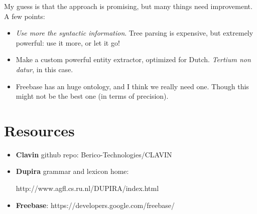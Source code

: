 \documentclass[11pt,leqno,fleqn]{article}
\begin{document}
My guess is that the approach is promising, but many things need improvement. A few points:
\begin{itemize}
\item \emph{Use more the syntactic information}. Tree parsing is expensive, but extremely powerful: use it more, or let it go!
\item Make a custom powerful entity extractor, optimized for Dutch. \emph{Tertium non datur}, in this case.
\item Freebase has an huge ontology, and I think we really need one. Though this might not be the best one (in terms of precision).
\end{itemize}


\section*{Resources}
\begin{itemize}
\item \textbf{Clavin} github repo: Berico-Technologies/CLAVIN
\item \textbf{Dupira} grammar and lexicon home:

http://www.agfl.cs.ru.nl/DUPIRA/index.html
\item \textbf{Freebase}: https://developers.google.com/freebase/
\end{itemize}

\end{document}

